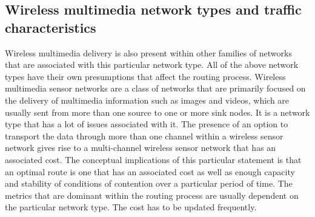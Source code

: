 \documentclass[12pt]{article}
\begin{document}
    \subsection{Wireless multimedia network types and traffic characteristics}
    Wireless multimedia delivery is also present within other families of networks that are associated with this particular network type. All of the above network types have their own presumptions that affect the routing process. Wireless multimedia sensor networks are a class of networks that are primarily focused on the delivery of multimedia information such as images and videos, which are usually sent from more than one source to one or more sink nodes. It is a network type that has a lot of issues associated with it. The presence of an option to transport the data through more than one channel within a wireless sensor network gives rise to a multi-channel wireless sensor network that has an associated cost. The conceptual implications of this particular statement is that an optimal route is one that has an associated cost as well as enough capacity and stability of conditions of contention over a particular period of time. The metrics that are dominant within the routing process are usually dependent on the particular network type. The cost has to be updated frequently.
\end{document}
